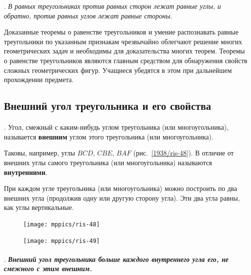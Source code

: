 \documentclass[oneside]{book}
\begin{document}
\mbox{.}
\emph{В равных треугольниках против равных сторон лежат равные углы, и обратно, против равных углов лежат равные стороны.}

Доказанные теоремы о равенстве треугольников и умение распознавать равные треугольники по указанным признакам чрезвычайно облегчают решение многих геометрических задач и необходимы для доказательства многих теорем.
Теоремы о равенстве треугольников являются главным средством для обнаружения свойств сложных геометрических фигур.
Учащиеся убедятся в этом при дальнейшем прохождении предмета.

\subsection*{Внешний угол треугольника и его свойства}

\paragraph{}\label{1938/43}
\mbox{.}
Угол, смежный с каким-нибудь углом треугольника (или многоугольника), называется \textbf{внешним} углом этого треугольника (или многоугольника).

Таковы, например, углы $BCD$, $CBE$, $BAF$ (рис.~\ref{1938/ris-48}).
В отличие от внешних углы самого треугольника (или многоугольника) называются \textbf{внутренними}.

При каждом угле треугольника (или многоугольника) можно построить по два внешних угла (продолжив одну или другую сторону угла).
Эти два угла равны, как углы вертикальные.

\begin{figure}[h!]
\begin{minipage}{.48\textwidth}
\centering
\texttt{[image: mppics/ris-48]}
\caption{}\label{1938/ris-48}
\end{minipage}\hfill
\begin{minipage}{.48\textwidth}
\centering
\texttt{[image: mppics/ris-49]}
\caption{}\label{1938/ris-49}
\end{minipage}
\end{figure}

\paragraph{}\label{1938/44}
\mbox{.}
\textbf{\emph{Внешний угол треугольника больше каждого внутреннего угла его, не смежного с этим внешним.}}
\end{document}

